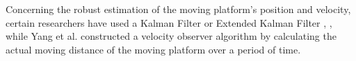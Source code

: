 \documentclass[conference]{IEEEtran}
\begin{document}
Concerning the robust estimation of the moving platform's position and velocity, certain researchers have used a Kalman Filter or Extended Kalman Filter \cite{araar2017vision}, \cite{feng2018autonomous}, \cite{falanga2017vision} while Yang et al. \cite{yang2018hybrid} constructed a velocity observer algorithm by calculating the actual moving distance of the moving platform over a period of time. 

















\end{document}
